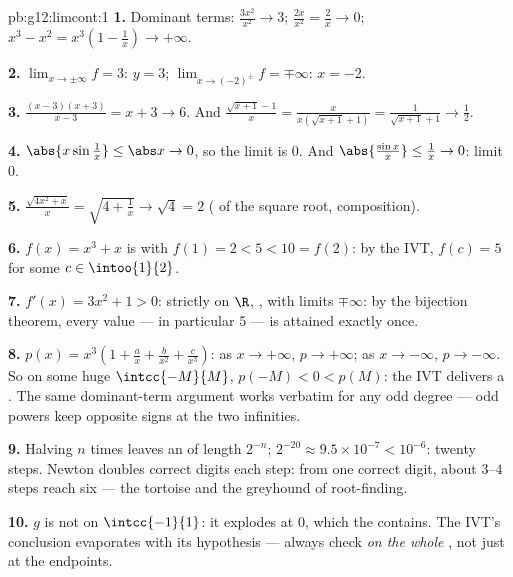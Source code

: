 \begin{solution}{pb:g12:limcont:1}
\textbf{1.} Dominant terms: $\frac{3x^2}{x^2} \to 3$;
$\frac{2x}{x^2} = \frac2x \to 0$;
$x^3 - x^2 = x^3\left(1 - \frac1x\right) \to +\infty$.

\textbf{2.} $\lim_{x \to \pm\infty} f = 3$:  $y = 3$; $\lim_{x \to (-2)^\pm} f = \mp\infty$:
 $x = -2$.

\textbf{3.} $\frac{(x-3)(x+3)}{x - 3} = x + 3 \to 6$. And
$\frac{\sqrt{x+1} - 1}{x} = \frac{x}{x(\sqrt{x+1} + 1)} =
\frac{1}{\sqrt{x+1} + 1} \to \frac12$.

\textbf{4.} $\abs{x \sin\frac1x} \leq \abs x \to 0$, so the
limit is $0$. And
$\abs{\frac{\sin x}{x}} \leq \frac1x \to 0$: limit $0$.

\textbf{5.} $\frac{\sqrt{4x^2 + x}}{x} =
\sqrt{4 + \frac1x} \to \sqrt4 = 2$ ( of the square
root, composition).

\textbf{6.} $f(x) = x^3 + x$ is  with
$f(1) = 2 < 5 < 10 = f(2)$: by the IVT, $f(c) = 5$ for some
$c \in \intoo{1}{2}$.

\textbf{7.} $f'(x) = 3x^2 + 1 > 0$: strictly  on
$\R$, , with limits $\mp\infty$: by the bijection
theorem, every value --- in particular $5$ --- is attained
exactly once.

\textbf{8.} $p(x) = x^3\left(1 + \frac ax + \frac{b}{x^2} +
\frac{c}{x^3}\right)$: as $x \to +\infty$, $p \to +\infty$; as
$x \to -\infty$, $p \to -\infty$. So on some huge 
$\intcc{-M}{M}$, $p(-M) < 0 < p(M)$: the IVT delivers a .
The same dominant-term argument works verbatim for any odd
degree --- odd powers keep opposite signs at the two
infinities.

\textbf{9.} Halving $n$ times leaves an  of length
$2^{-n}$; $2^{-20} \approx 9.5 \times 10^{-7} < 10^{-6}$:
twenty steps. Newton doubles correct digits each step: from
one correct digit, about $3$--$4$ steps reach six --- the
tortoise and the greyhound of root-finding.

\textbf{10.} $g$ is not  on $\intcc{-1}{1}$: it
explodes at $0$, which the  contains. The IVT's
conclusion evaporates with its hypothesis --- always check
 \emph{on the whole }, not just at the
endpoints.


\end{solution}

